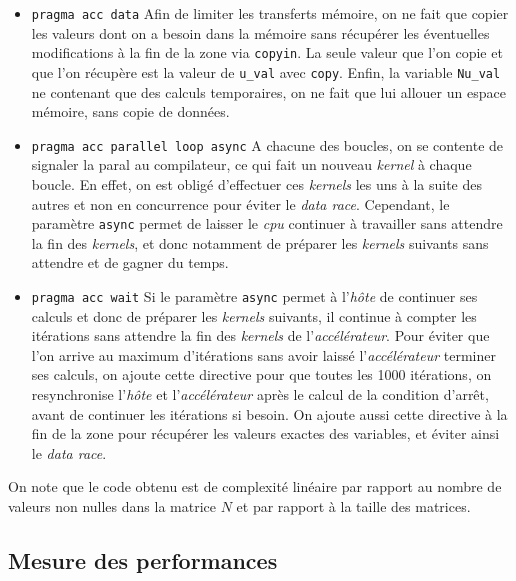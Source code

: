 \documentclass{article}
\begin{document}
\begin{itemize}
	\item \texttt{pragma acc data} Afin de limiter les transferts mémoire, on ne fait que copier les valeurs dont on a besoin dans la mémoire sans récupérer les éventuelles modifications à la fin de la zone via \texttt{copyin}. La seule valeur que l'on copie et que l'on récupère est la valeur de \texttt{u\_val} avec \texttt{copy}. Enfin, la variable \texttt{Nu\_val} ne contenant que des calculs temporaires, on ne fait que lui allouer un espace mémoire, sans copie de données.
	\item \texttt{pragma acc parallel loop async} A chacune des boucles, on se contente de signaler la \gls{paral} au compilateur, ce qui fait un nouveau \textit{kernel} à chaque boucle. En effet, on est obligé d'effectuer ces \textit{kernels} les uns à la suite des autres et non en concurrence pour éviter le \textit{data race}. Cependant, le paramètre \texttt{async} permet de laisser le \textit{\gls{cpu}} continuer à travailler sans attendre la fin des \textit{kernels}, et donc notamment de préparer les \textit{kernels} suivants sans attendre et de gagner du temps.
	\item \texttt{pragma acc wait} Si le paramètre \texttt{async} permet à l'\textit{hôte} de continuer ses calculs et donc de préparer les \textit{kernels} suivants, il continue à compter les itérations sans attendre la fin des \textit{kernels} de l'\textit{accélérateur}. Pour éviter que l'on arrive au maximum d'itérations sans avoir laissé l'\textit{accélérateur} terminer ses calculs, on ajoute cette directive pour que toutes les 1000 itérations, on resynchronise l'\textit{hôte} et l'\textit{accélérateur} après le calcul de la condition d'arrêt, avant de continuer les itérations si besoin. On ajoute aussi cette directive à la fin de la zone pour récupérer les valeurs exactes des variables, et éviter ainsi le \textit{data race}.
\end{itemize}

On note que le code obtenu est de complexité linéaire par rapport au nombre de valeurs non nulles dans la matrice $N$ et par rapport à la taille des matrices.

\subsection{Mesure des performances}
\end{document}
